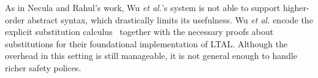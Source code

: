 \documentclass{llncs}
\begin{document}
As in Necula and Rahul's work, Wu {\em et al.}'s system is not able to
support higher-order abstract syntax, which drastically limits its
usefulness. Wu {\em et al.}\cite{Appel:PPDP03} encode the explicit
substitution calculus~\cite{Abadi:POPL90} together with the necessary
proofs about substitutions for their foundational implementation of
LTAL. Although the overhead in this setting is still manageable, it is
not general enough to handle richer safety polices.








\end{document}
